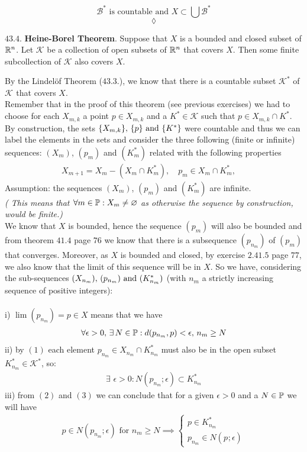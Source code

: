 $$\mathscr{B^{*}}\text{ is countable and } X\subset \bigcup \mathscr{B^{*}}$$
$$\lozenge$$
\newpage
\begin{tcolorbox}[colback=white]
$\mathbf{43.4.}$ \textbf{Heine-Borel Theorem}. Suppose that  $X$ is a bounded and closed subset of $\mathbb{R}^n$. Let $\mathscr{K} $ be  a collection of open subsets of $\mathbb{R}^n$ that covers $X$. Then some finite subcollection of  $\mathscr{K}$ also covers $X$.
\end{tcolorbox}
By the Lindelöf Theorem ($\mathbf{43.3.}$), we know that there is a countable subset $\mathscr{K}^{*}$ of $\mathscr{K}^{}$ that covers $X$. \\
Remember that in the proof of this theorem (see previous exercises) we had to choose for each $X_{m,k}$  a point $p\in X_{m,k}$ and a $K^{*}\in\mathscr{K}$ such that $p\in X_{m,k}\cap K^{*}$. By construction, the sets $\{X_{m,k}\},\, \{p\}\text{ and } \{K^{*}\}$ were countable and thus we can label the elements in the sets and consider the three following (finite or infinite) sequences: $(X_m)$, $(p_m)$ and $(K^{*}_m)$ related with the following properties 
\begin{align}
X_{m+1}= X_m-\left(X_m\cap K^{*}_m \right),\quad p_m\in X_m\cap K^{*}_m,\ \quad 
\end{align}
Assumption: the sequences $(X_m)$, $(p_m)$ and $(K^{*}_m)$ are infinite.\\
\textit{( This means that $\forall m\in\mathbb{P}: X_{m} \neq\varnothing$ as otherwise the sequence by construction, would be finite.)}\\

We know that $X$ is bounded, hence the sequence $\left(p_{m}\right)$ will also be bounded and from theorem $\mathbf{41.4}$ page $76$ we know that there is a subsequence $\left(p_{n_m}\right)$ of $\left(p_{m}\right)$ that converges. Moreover, as $X$ is bounded and closed, by exercise $\mathbf{2.41.5}$ page $77$, we also know that the limit of this sequence will be in $X$.
So we have, considering the sub-sequences $(X_{n_m}),\, (p_{n_m})\text{ and } (K^{*}_{n_m})$ (with $n_m$ a strictly increasing sequence of positive integers):\\\\
i) $\lim (p_{n_m})=p\in X$ means that we have
\begin{align}
\forall \epsilon>0,\, \exists\, N\in \mathbb{P}: d(p_{n_m},p)<\epsilon,\, n_m\geq N
\end{align}
ii) by $(1)$ each element $p_{n_m}\in X_{n_m}\cap K^{*}_{n_m}$  must also be in the open subset $K^{*}_{n_m}\in \mathscr{K}^{*}$, so:
\begin{align}
\exists\,\, \epsilon >0: N(p_{n_m};\epsilon)\subset K^{*}_{n_m}
\end{align}
iii) from $(2)$ and $(3)$ we can conclude that for a given $\epsilon>0$ and a $N\in\mathbb{P}$ we will have
\begin{align}
p\in N(p_{n_m};\epsilon) \text{  for }n_m\geq N \implies
\left\{\begin{array}{l }
 p\in  K^{*}_{n_m}\\
p_{n_m}\in N(p_{};\epsilon)
\end{array}\right.
\end{align}

